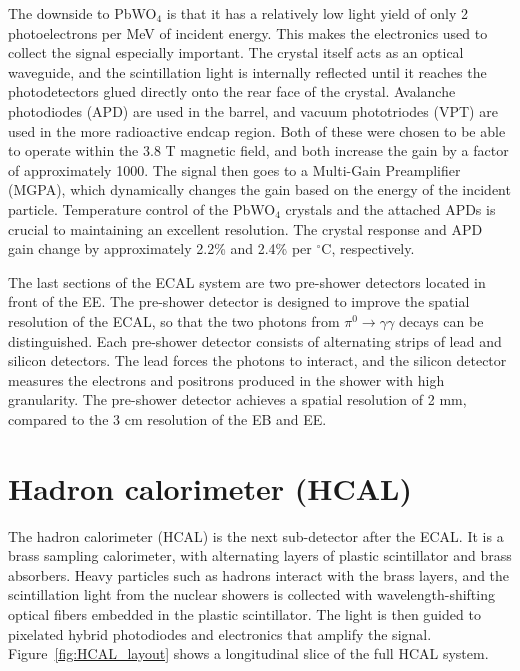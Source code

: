 The downside to PbWO$_4$ is that it has a relatively low light yield of only 2 photoelectrons per MeV of incident energy. This makes the electronics used to collect the signal especially important. The crystal itself acts as an optical waveguide, and the scintillation light is internally reflected until it reaches the photodetectors glued directly onto the rear face of the crystal. Avalanche photodiodes (APD) are used in the barrel, and vacuum phototriodes (VPT) are used in the more radioactive endcap region. Both of these were chosen to be able to operate within the 3.8 T magnetic field, and both increase the gain by a factor of approximately 1000.
The signal then goes to a Multi-Gain Preamplifier (MGPA), which dynamically changes the gain based on the energy of the incident particle. 
Temperature control of the PbWO$_4$ crystals and the attached APDs is crucial to maintaining an excellent resolution. The crystal response and APD gain change by approximately 2.2\% and 2.4\% per $^\circ$C, respectively. 

The last sections of the ECAL system are two pre-shower detectors located in front of the EE. The pre-shower detector is designed to improve the spatial resolution of the ECAL, so that the two photons from $\pi^0\rightarrow\gamma\gamma$ decays can be distinguished. Each pre-shower detector consists of alternating strips of lead and silicon detectors. The lead forces the photons to interact, and the silicon detector measures the electrons and positrons produced in the shower with high granularity. The pre-shower detector achieves a spatial resolution of 2 mm, compared to the 3 cm resolution of the EB and EE. 



\section{Hadron calorimeter (HCAL)}
\label{sec:HCAL}
The hadron calorimeter (HCAL) is the next sub-detector after the ECAL. It is a brass sampling calorimeter, with alternating layers of plastic scintillator and brass absorbers. 
Heavy particles such as hadrons interact with the brass layers, and the scintillation light from the nuclear showers is collected with wavelength-shifting optical fibers embedded in the plastic scintillator. The light is then guided to pixelated hybrid photodiodes and electronics that amplify the signal. Figure~\ref{fig:HCAL_layout} shows a longitudinal slice of the full HCAL system. 

